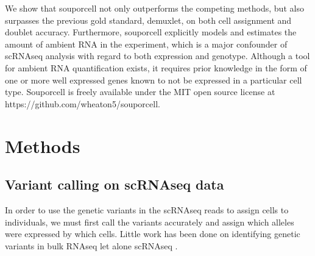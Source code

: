 \par{
We show that souporcell not only outperforms the competing methods, but also surpasses the previous gold standard, demuxlet, on both cell assignment and doublet accuracy. Furthermore, souporcell explicitly models and estimates the amount of ambient RNA in the experiment, which is a major confounder of scRNAseq analysis with regard to both expression and genotype. Although a tool for ambient RNA quantification exists\cite{soupx}, it requires prior knowledge in the form of one or more well expressed genes known to not be expressed in a particular cell type. Souporcell is freely available under the MIT open source license at https://github.com/wheaton5/souporcell.
}


\section{Methods} %
\subsection{Variant calling on scRNAseq data}
In order to use the genetic variants in the scRNAseq reads to assign cells to individuals, we must first call the variants accurately and assign which alleles were expressed by which cells. Little work has been done on identifying genetic variants in bulk RNAseq \cite{RNAvariant} let alone scRNAseq \cite{vartrix}\cite{cellsnp}. 



